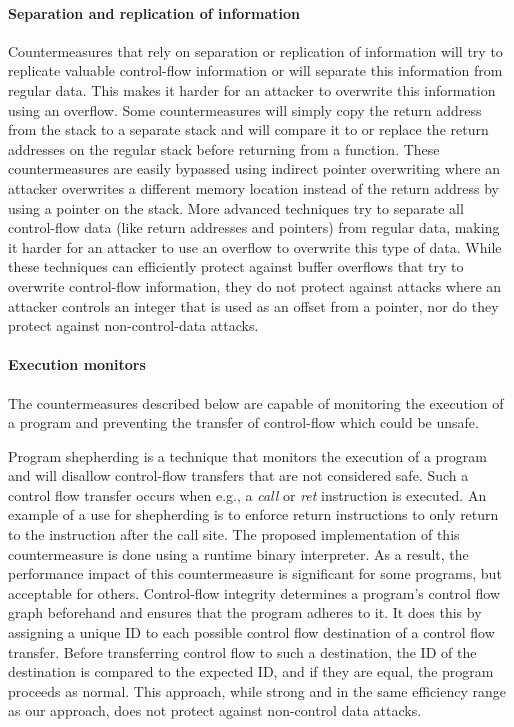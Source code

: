 \paragraph{Separation and replication of information}
Countermeasures that rely on separation or replication of information will try to replicate valuable control-flow information \cite{Younan:2006:EPA,Younan:2006:EPA2, Chiueh:2001:RCT, Vendicator:20xx:DS} or will separate this information from regular data. This makes it harder for an attacker to overwrite this information using an overflow. Some countermeasures will simply copy the return address from the stack to a separate stack and will compare it to or replace the return addresses on the regular stack before returning from a function. These countermeasures are easily bypassed using indirect pointer overwriting where an attacker overwrites a different memory location instead of the return address by using a pointer on the stack.  More advanced techniques try to separate all control-flow data (like return addresses and pointers) from regular data, making it harder for an attacker to use an overflow to overwrite this type of data.
While these techniques can efficiently protect against buffer overflows that try to overwrite control-flow information, they do not protect against attacks where an attacker controls an integer that is used as an offset from a pointer, nor do they protect against non-control-data attacks.

\paragraph{Execution monitors}
The countermeasures described below are capable of monitoring the execution of a program and preventing the transfer of control-flow which could be unsafe. 

Program shepherding \cite{Kiriansky:2002:SEP} is a technique that monitors the execution of a program and will disallow control-flow transfers that are not considered safe. Such a control flow transfer occurs when e.g., a \emph{call} or \emph{ret} instruction is executed. 
An example of a use for shepherding is to enforce return instructions to only return to the instruction after the call site. The proposed implementation of this countermeasure is done using a runtime binary interpreter. As a result, the performance impact of this countermeasure is significant for some programs, but acceptable for others.
Control-flow integrity \cite{Abadi:2005:CFI} determines a program's control flow graph beforehand and ensures that the program adheres to it. It does this by assigning  a unique ID to each possible control flow destination of a control flow transfer. Before transferring control flow to such a destination, the ID of the destination is compared to the expected ID, and if they are equal, the program proceeds as normal.  This approach, while strong and in the same efficiency range as our approach, does not protect against non-control data attacks.


